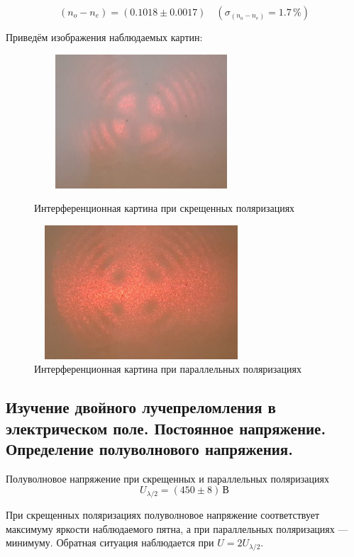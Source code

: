 \documentclass[12pt]{article}
\begin{document}
\[
	\left(n_o - n_e \right) = \left( 0.1018 \pm 0.0017 \right) \quad \left( \sigma_\text{$\left( n_o - n_e \right)$}  = 1.7 \, \% \right)
\]
\newpage
\par
	Приведём изображения наблюдаемых картин:
\begin{figure}[h!]
	\begin{multicols}{2}
		\hfill
		\includegraphics[width = 8cm, height = 5cm]{image5.png}
		\caption{Интерференционная картина при скрещенных поляризациях}
		\hfill
		\includegraphics[width = 8cm, height = 5cm]{image6.png}
		\caption{Интерференционная картина при параллельных поляризациях}
		\hfill
	\end{multicols}
\end{figure}

\subsection*{Изучение двойного лучепреломления в электрическом поле. Постоянное напряжение. Определение полуволнового напряжения.}
\par
	Полуволновое напряжение при скрещенных и параллельных поляризациях
\[
	U_\text{$\lambda / 2$} = \left( 450 \pm 8 \right) \, \text{В}
\]
\par
	При скрещенных поляризациях полуволновое напряжение соответствует максимуму яркости наблюдаемого пятна, а при параллельных поляризациях --- минимуму. Обратная ситуация наблюдается при $U = 2 U_\text{$\lambda / 2$}$.
\end{document}
